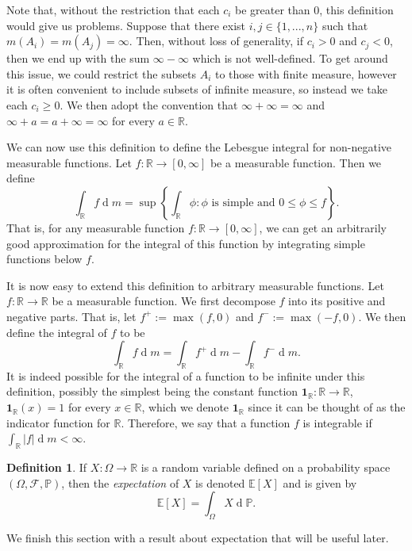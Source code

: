 \documentclass[a4paper,11pt]{article}
\DeclareMathOperator{\dee}{d}
\theoremstyle{plain}
\theoremstyle{definition}
\newtheorem{definition}[theorem]{Definition}
\begin{document}
Note that, without the restriction that each $c_i$ be greater than $0$, this definition would give us problems. Suppose that there exist $i,j \in \{1,...,n\}$ such that $m(A_i) = m(A_j) = \infty$. Then, without loss of generality, if $c_i > 0$ and $c_j < 0$, then we end up with the sum $\infty - \infty$ which is not well-defined. To get around this issue, we could restrict the subsets $A_i$ to those with finite measure, however it is often convenient to include subsets of infinite measure, so instead we take each $c_i \geq 0$. We then adopt the convention that $\infty + \infty = \infty$ and $\infty + a = a + \infty = \infty$ for every $a \in \mathbb{R}$.

We can now use this definition to define the Lebesgue integral for non-negative measurable functions. Let $f:\mathbb{R} \rightarrow [0,\infty]$ be a measurable function. Then we define
\[
\int_{\mathbb{R}} f {\dee}m = \sup\left\{\int_{\mathbb{R}} \phi: \phi \text{ is simple and } 0 \leq \phi \leq f\right\}.
\]
That is, for any measurable function $f:\mathbb{R} \rightarrow [0,\infty]$, we can get an arbitrarily good approximation for the integral of this function by integrating simple functions below $f$.

It is now easy to extend this definition to arbitrary measurable functions. Let $f:\mathbb{R} \to \mathbb{R}$ be a measurable function. We first decompose $f$ into its positive and negative parts. That is, let $f^+ := \max(f,0)$ and $f^- := \max(-f,0)$. We then define the integral of $f$ to be
\[
\int_{\mathbb{R}} f {\dee}m = \int_{\mathbb{R}} f^+ {\dee}m - \int_{\mathbb{R}} f^- {\dee}m.
\]
It is indeed possible for the integral of a function to be infinite under this definition, possibly the simplest being the constant function $\mathbf{1}_\mathbb{R}:\mathbb{R} \to \mathbb{R}$, $\mathbf{1}_\mathbb{R}(x) = 1$ for every $x \in \mathbb{R}$, which we denote $\mathbf{1}_\mathbb{R}$ since it can be thought of as the indicator function for $\mathbb{R}$. Therefore, we say that a function $f$ is integrable if $\int_{\mathbb{R}} |f|{\dee}m < \infty$.

\begin{definition} \citep[p.~114]{MC}
If $X:\Omega \rightarrow \mathbb{R}$ is a random variable defined on a probability space $(\Omega,\mathcal{F},\mathbb{P})$, then the \textit{expectation} of $X$ is denoted $\mathbb{E}[X]$ and is given by
\[
\mathbb{E}[X] = \int_{\Omega} X {\dee}\mathbb{P}.
\]
\end{definition}

We finish this section with a result about expectation that will be useful later.
\end{document}
